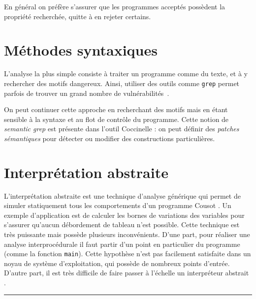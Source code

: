 En général on préfère s'assurer que les programmes acceptés possèdent la
propriété recherchée, quitte à en rejeter certains.

\section{Méthodes syntaxiques}

L'analyse la plus simple consiste à traiter un programme comme du texte, et à y
rechercher des motifs dangereux. Ainsi, utiliser des outils comme \texttt{grep}
permet parfois de trouver un grand nombre de vulnérabilités~\cite{SpenderGrep}.

On peut continuer cette approche en recherchant des motifs mais en étant
sensible à la syntaxe et au flot de contrôle du programme. Cette notion de
\emph{semantic grep} est présente dans l'outil Coccinelle
\cite{coccinelle09,coccinelle11}  : on peut définir des
\emph{patches sémantiques} pour détecter ou modifier des constructions
particulières.

\section{Interprétation abstraite}

L'interprétation abstraite est une technique d'analyse générique qui permet de
simuler statiquement tous les comportements d'un programme Cousot
\cite{Cousot77,Cousot92-1}. Un exemple d'application est de calculer les bornes
de variations des variables pour s'assurer qu'aucun débordement de tableau n'est
possible. Cette technique est très puissante mais possède plusieurs
inconvénients. D'une part, pour réaliser une analyse interprocédurale il faut
partir d'un point en particulier du programme (comme la fonction \texttt{main}).
Cette hypothèse n'est pas facilement satisfaite dans un noyau de système
d'exploitation, qui possède de nombreux points d'entrée. D'autre part,
il est très difficile de faire passer à l'échelle un interpréteur abstrait
\cite{AstreeScale,coverityBillion}.

\begin{center}\rule{3in}{0.4pt}\end{center}

